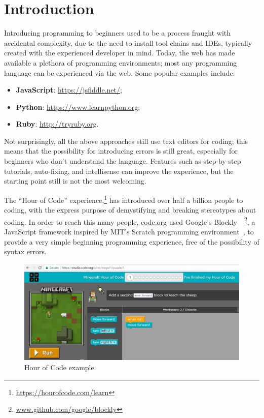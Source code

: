 \section{Introduction}


Introducing programming to beginners used to be a process fraught with
accidental complexity, due to the need to install tool chains and IDEs, 
typically created with the experienced developer in mind. Today, 
the web has made available a plethora of programming environments;
most any programming language can be experienced via the web. 
Some popular examples include:
\begin{itemize}
\item {\bf JavaScript}: \url{https://jsfiddle.net/};
\item {\bf Python}: \url{https://www.learnpython.org};
\item {\bf Ruby}: \url{http://tryruby.org}.
\end{itemize}
Not surprisingly, all the above approaches still use text editors for coding;
this means that the possibility for introducing errors is still great, especially 
for beginners who don't understand the language. Features such as step-by-step 
tutorials, auto-fixing, and intellisense can
improve the experience, but the starting point still is not the most welcoming. 


The ``Hour of Code'' experience,\footnote{\url{https://hourofcode.com/learn}} 
has introduced over half a billion people to coding, with the express purpose 
of demystifying and breaking stereotypes about coding.
In order to reach this many people, \url{code.org} used
Google's Blockly~\cite{Blocky2015}~\footnote{\url{www.github.com/google/blockly}},
a JavaScript framework inspired by MIT's Scratch programming 
environment~\cite{ScratchCACM2009},
to provide a very simple beginning programming experience, 
free of the possibility of syntax errors. 

\begin{figure}[t]
    \includegraphics[width=\columnwidth]{pics/hourofcode}
\caption{\label{fig:hoc}Hour of Code example.}
\end{figure}

